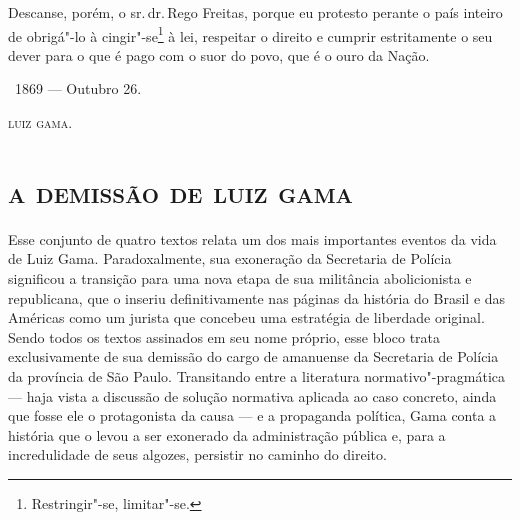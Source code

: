 Descanse, porém, o sr.\,dr.\,Rego Freitas, porque eu protesto perante o
país inteiro de obrigá"-lo à cingir"-se\footnote{Restringir"-se,
  limitar"-se.} à lei,
respeitar o direito e cumprir estritamente o seu dever para o que é pago
com o suor do povo, que é o ouro da Nação.

\medskip

\hfill\ 1869 --- Outubro 26.\smallskip

\hfill\textsc{luiz gama.}

\paginabranca
\begingroup\makeatletter\@openrightfalse
\part{\textsc{a demissão de luiz gama}}

\thispagestyle{empty}
\mbox{}\vfill
{\small\noindent
Esse conjunto de quatro textos relata um dos mais importantes
eventos da vida de Luiz Gama. Paradoxalmente, sua exoneração da
Secretaria de Polícia significou a transição para uma nova etapa de sua
militância abolicionista e republicana, que o inseriu definitivamente
nas páginas da história do Brasil e das Américas
como um jurista que concebeu uma estratégia de liberdade original. Sendo
todos os textos assinados em seu nome próprio, esse bloco trata
exclusivamente de sua demissão do cargo de amanuense da Secretaria de
Polícia da província de São Paulo. Transitando entre a literatura
normativo"-pragmática --- haja vista a discussão de solução normativa
aplicada ao caso concreto, ainda que fosse ele o protagonista da causa
--- e a propaganda política, Gama conta a história que o levou a ser
exonerado da administração pública e, para a incredulidade de seus
algozes, persistir no caminho do direito.}
\@openrighttrue\makeatother \endgroup

\pagebreak
\movetooddpage

\paginabranca
\mbox{}\vfill
\thispagestyle{empty}

